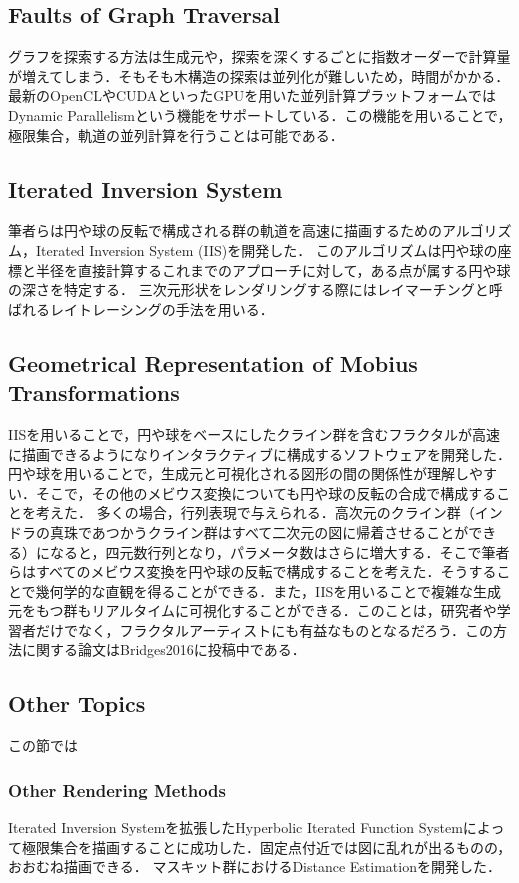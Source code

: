 \subsection{Faults of Graph Traversal}
グラフを探索する方法は生成元や，探索を深くするごとに指数オーダーで計算量が増えてしまう．そもそも木構造の探索は並列化が難しいため，時間がかかる．
最新のOpenCLやCUDAといったGPUを用いた並列計算プラットフォームではDynamic Parallelismという機能をサポートしている．この機能を用いることで，極限集合，軌道の並列計算を行うことは可能である．

\subsection{Iterated Inversion System}
筆者らは円や球の反転で構成される群の軌道を高速に描画するためのアルゴリズム，Iterated Inversion System (IIS)を開発した．
このアルゴリズムは円や球の座標と半径を直接計算するこれまでのアプローチに対して，ある点が属する円や球の深さを特定する．
三次元形状をレンダリングする際にはレイマーチングと呼ばれるレイトレーシングの手法を用いる．

\subsection{Geometrical Representation of Mobius Transformations}
IISを用いることで，円や球をベースにしたクライン群を含むフラクタルが高速に描画できるようになりインタラクティブに構成するソフトウェアを開発した．
円や球を用いることで，生成元と可視化される図形の間の関係性が理解しやすい．そこで，その他のメビウス変換についても円や球の反転の合成で構成することを考えた．
多くの場合，行列表現で与えられる．高次元のクライン群（インドラの真珠であつかうクライン群はすべて二次元の図に帰着させることができる）になると，四元数行列となり，パラメータ数はさらに増大する．そこで筆者らはすべてのメビウス変換を円や球の反転で構成することを考えた．そうすることで幾何学的な直観を得ることができる．また，IISを用いることで複雑な生成元をもつ群もリアルタイムに可視化することができる．このことは，研究者や学習者だけでなく，フラクタルアーティストにも有益なものとなるだろう．この方法に関する論文はBridges2016に投稿中である．

\subsection{Other Topics}
この節では

\subsubsection{Other Rendering Methods}
Iterated Inversion Systemを拡張したHyperbolic Iterated Function Systemによって極限集合を描画することに成功した．固定点付近では図に乱れが出るものの，おおむね描画できる．
マスキット群におけるDistance Estimationを開発した．

